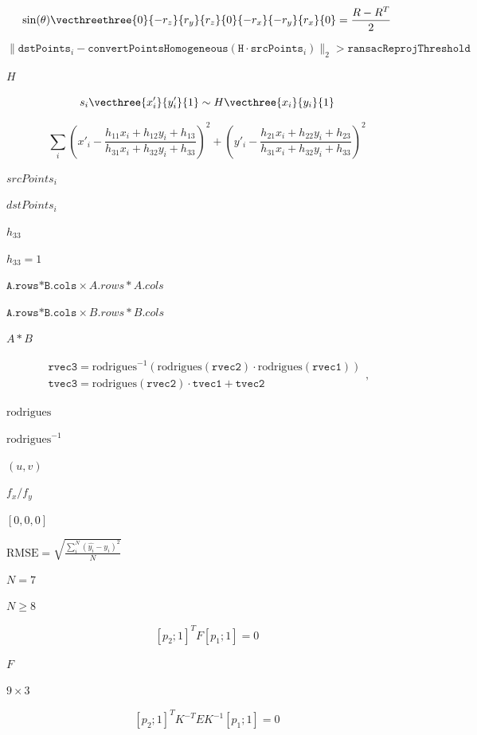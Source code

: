 \documentclass{article}
\begin{document}
\[\sin ( \theta ) \vecthreethree{0}{-r_z}{r_y}{r_z}{0}{-r_x}{-r_y}{r_x}{0} = \frac{R - R^T}{2}\]
\pagebreak

\[\| \texttt{dstPoints} _i -  \texttt{convertPointsHomogeneous} ( \texttt{H} \cdot \texttt{srcPoints} _i) \|_2  >  \texttt{ransacReprojThreshold}\]
\pagebreak

$H$
\pagebreak

\[s_i  \vecthree{x'_i}{y'_i}{1} \sim H  \vecthree{x_i}{y_i}{1}\]
\pagebreak

\[\sum _i \left ( x'_i- \frac{h_{11} x_i + h_{12} y_i + h_{13}}{h_{31} x_i + h_{32} y_i + h_{33}} \right )^2+ \left ( y'_i- \frac{h_{21} x_i + h_{22} y_i + h_{23}}{h_{31} x_i + h_{32} y_i + h_{33}} \right )^2\]
\pagebreak

$srcPoints_i$
\pagebreak

$dstPoints_i$
\pagebreak

$h_{33}$
\pagebreak

$h_{33}=1$
\pagebreak

$\texttt{A.rows*B.cols} \times {A.rows*A.cols}$
\pagebreak

$\texttt{A.rows*B.cols} \times {B.rows*B.cols}$
\pagebreak

$A*B$
\pagebreak

\[\begin{array}{l} \texttt{rvec3} =  \mathrm{rodrigues} ^{-1} \left ( \mathrm{rodrigues} ( \texttt{rvec2} )  \cdot \mathrm{rodrigues} ( \texttt{rvec1} ) \right )  \\ \texttt{tvec3} =  \mathrm{rodrigues} ( \texttt{rvec2} )  \cdot \texttt{tvec1} +  \texttt{tvec2} \end{array} ,\]
\pagebreak

$\mathrm{rodrigues}$
\pagebreak

$\mathrm{rodrigues}^{-1}$
\pagebreak

$(u, v)$
\pagebreak

$f_x / f_y$
\pagebreak

$[0, 0, 0]$
\pagebreak

$ \text{RMSE} = \sqrt{\frac{\sum_{i}^{N} \left ( \hat{y_i} - y_i \right )^2}{N}} $
\pagebreak

$N = 7$
\pagebreak

$N \ge 8$
\pagebreak

\[[p_2; 1]^T F [p_1; 1] = 0\]
\pagebreak

$F$
\pagebreak

$9 \times 3$
\pagebreak

\[[p_2; 1]^T K^{-T} E K^{-1} [p_1; 1] = 0\]
\pagebreak
\end{document}
